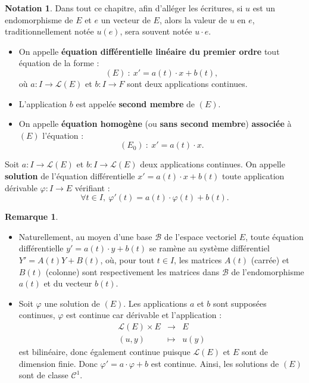 \documentclass[french]{article}
\theoremstyle{plain}
\theoremstyle{definition}
\newtheorem*{rmq}{Remarque}
\newtheorem*{notation}{Notation}
\theoremstyle{remark}
\begin{document}
\begin{notation}
	Dans tout ce chapitre, afin d'alléger les écritures, si $u$ est un endomorphisme de $E$ et $e$ un vecteur de $E$, alors la valeur de $u$ en $e$, traditionnellement notée $u(e)$, sera souvent notée $u\cdot e$.
\end{notation}

\begin{dfn}
	\begin{itemize}
		\item On appelle \textbf{équation différentielle linéaire du premier ordre} tout équation de la forme :
		$$(E)\ :\ x'=a(t)\cdot x+b(t),$$ où $a:I\to\mathcal{L}(E)$ et $b:I\to F$ sont deux applications continues.
		\item L'application $b$ est appelée \textbf{second membre} de $(E)$.
		\item On appelle \textbf{équation homogène} (ou \textbf{sans second membre}) \textbf{associée} à $(E)$ l'équation :
		$$(E_0)\ :\ x'=a(t)\cdot x.$$
	\end{itemize}
\end{dfn}

\begin{dfn}
	Soit $a:I\to\mathcal{L}(E)$ et $b:I\to\mathcal{L}(E)$ deux applications continues. On appelle \textbf{solution} de l'équation différentielle $x'=a(t)\cdot x+b(t)$ toute application dérivable $\varphi:I\to E$ vérifiant :
	$$\forall t\in I,\ \varphi'(t)=a(t)\cdot\varphi(t)+b(t).$$
\end{dfn}

\begin{rmq}
	\begin{itemize}
		\item Naturellement, au moyen d'une base $\mathcal{B}$ de l'espace vectoriel $E$, toute équation différentielle $y'=a(t)\cdot y+b(t)$ se ramène au système différentiel $Y'=A(t)Y+B(t)$, où, pour tout $t\in I$, les matrices $A(t)$ (carrée) et $B(t)$ (colonne) sont respectivement les matrices dans $\mathcal{B}$ de l'endomorphisme $a(t)$ et du vecteur $b(t)$.
		\item Soit $\varphi$ une solution de $(E)$. Les applications $a$ et $b$ sont supposées continues, $\varphi$ est continue car dérivable et l'application :
		$$\begin{array}{rcl}
			\mathcal{L}(E)\times E&\longrightarrow&E\\
			(u,y)&\longmapsto&u(y)
		\end{array}$$ est bilinéaire, donc également continue puisque $\mathcal{L}(E)$ et $E$ sont de dimension finie. Donc $\varphi'=a\cdot\varphi+b$ est continue. Ainsi, les solutions de $(E)$ sont de classe $\mathcal{C}^1$.
	\end{itemize}
\end{rmq}
\end{document}
